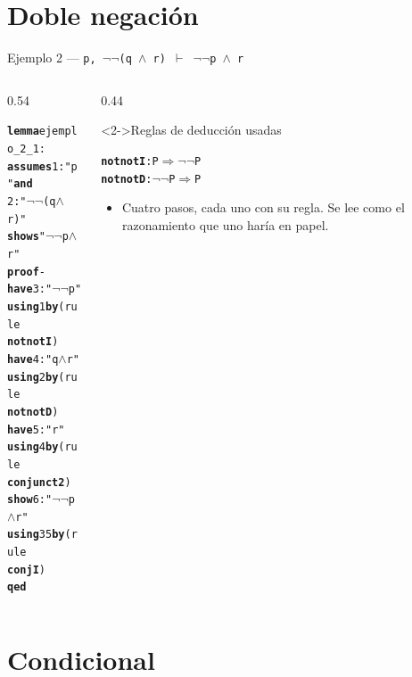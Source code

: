 \documentclass[11pt,aspectratio=169]{beamer}
\newcommand{\sAnd}{\(\wedge\)}
\newcommand{\sNot}{\(\neg\)}
\newcommand{\sMeta}{\(\Longrightarrow\)}
\newcommand{\sTurn}{\(\vdash\)}
\newcommand{\kw}[1]{\textcolor{isaCmd}{\textbf{#1}}}
\newcommand{\str}[1]{\textcolor{isaStr}{#1}}
\newcommand{\Rn}[1]{\textcolor{granate}{\textbf{#1}}}
\newcommand{\R}[1]{{\setlength{\fboxsep}{1pt}%
  \colorbox{resalte}{\ttfamily\bfseries\textcolor{granate}{#1}}}}
\begin{document}
\section{Doble negación}

\begin{frame}[fragile]{Ejemplo 2 --- \texttt{p, \sNot\sNot(q \sAnd{} r) \sTurn{} \sNot\sNot p \sAnd{} r}}
  \begin{columns}[T]
    \begin{column}{0.54\textwidth}
\begin{alltt}\footnotesize
\kw{lemma} ejemplo_2_1:
  \kw{assumes} 1: \str{"p"} \kw{and}
          2: \str{"\sNot\sNot(q \sAnd{} r)"}
  \kw{shows} \str{"\sNot\sNot p \sAnd{} r"}
\kw{proof} -
  \kw{have} 3: \str{"\sNot\sNot p"}
    \kw{using} 1 \kw{by} (rule \R{notnotI})
  \kw{have} 4: \str{"q \sAnd{} r"}
    \kw{using} 2 \kw{by} (rule \R{notnotD})
  \kw{have} 5: \str{"r"}
    \kw{using} 4 \kw{by} (rule \R{conjunct2})
  \kw{show} 6: \str{"\sNot\sNot p \sAnd{} r"}
    \kw{using} 3 5 \kw{by} (rule \R{conjI})
\kw{qed}
\end{alltt}
    \end{column}
    \begin{column}{0.44\textwidth}
      \begin{block}<2->{Reglas de deducción usadas}
\begin{alltt}\scriptsize
\Rn{notnotI}: P \sMeta{} \sNot\sNot P
\Rn{notnotD}: \sNot\sNot P \sMeta{} P
\end{alltt}
\end{block}
      \footnotesize
      \begin{itemize}
        \item<3-> Cuatro pasos, cada uno con su regla. Se lee como el
          razonamiento que uno haría en papel.
      \end{itemize}
    \end{column}
  \end{columns}
\end{frame}

\section{Condicional}
\end{document}
